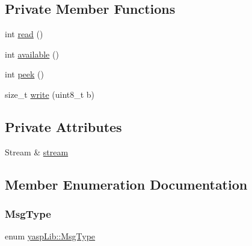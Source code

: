 \subsection*{Private Member Functions}
\begin{DoxyCompactItemize}
\item 
int \mbox{\hyperlink{classyasp_lib_a9336c4c9856879c5cff7d631d1e283bc}{read}} ()
\item 
int \mbox{\hyperlink{classyasp_lib_a7c052a8592e42a0b57044ddfada102e1}{available}} ()
\item 
int \mbox{\hyperlink{classyasp_lib_a91694d687c8c92726bceaeb71dbbb744}{peek}} ()
\item 
size\+\_\+t \mbox{\hyperlink{classyasp_lib_a56f661b7a24d7269f9c8169a96129e27}{write}} (uint8\+\_\+t b)
\end{DoxyCompactItemize}
\subsection*{Private Attributes}
\begin{DoxyCompactItemize}
\item 
Stream \& \mbox{\hyperlink{classyasp_lib_a57b0f8951e55f287de5f8381efe08930}{stream}}
\end{DoxyCompactItemize}


\subsection{Member Enumeration Documentation}
\mbox{\label{classyasp_lib_ac6d51b8644093b83092ae9041c655cdf}} 
\subsubsection{\texorpdfstring{MsgType}{MsgType}}
{\footnotesize\ttfamily enum \mbox{\hyperlink{classyasp_lib_ac6d51b8644093b83092ae9041c655cdf}{yasp\+Lib\+::\+Msg\+Type}}\hspace{0.3cm}{\ttfamily [private]}}

